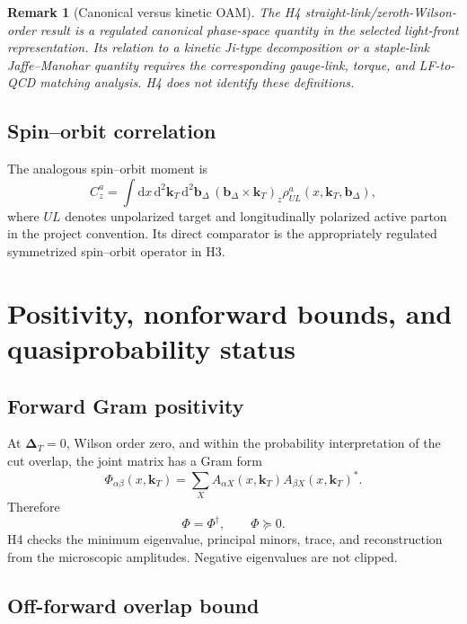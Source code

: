 \documentclass[11pt]{article}
\newtheorem{remark}[definition]{Remark}
\newcommand{\kT}{\bm{k}_{T}}
\newcommand{\DT}{\bm{\Delta}_{T}}
\newcommand{\bD}{\bm{b}_{\Delta}}
\newcommand{\dd}{\mathrm{d}}
\begin{document}
\begin{remark}[Canonical versus kinetic OAM]
The H4 straight-link/zeroth-Wilson-order result is a regulated canonical
phase-space quantity in the selected light-front representation.  Its relation
to a kinetic Ji-type decomposition or a staple-link Jaffe--Manohar quantity
requires the corresponding gauge-link, torque, and LF-to-QCD matching analysis.
H4 does not identify these definitions.
\end{remark}

\subsection{Spin--orbit correlation}

The analogous spin--orbit moment is
\begin{equation}
 C_z^a
 =\int\dd x\,\dd^2\kT\,\dd^2\bD\,
 (\bD\times\kT)_z
 \rho_{UL}^a(x,\kT,\bD),
 \label{eq:spin-orbit-wigner}
\end{equation}
where \(UL\) denotes unpolarized target and longitudinally polarized active
parton in the project convention.  Its direct comparator is the appropriately
regulated symmetrized spin--orbit operator in H3.

\section{Positivity, nonforward bounds, and quasiprobability status}
\label{sec:positivity}

\subsection{Forward Gram positivity}

At \(\DT=0\), Wilson order zero, and within the probability interpretation of
the cut overlap, the joint matrix has a Gram form
\begin{equation}
 \Phi_{\alpha\beta}(x,\kT)
 =\sum_X A_{\alpha X}(x,\kT)
 A_{\beta X}(x,\kT)^*.
 \label{eq:forward-gram}
\end{equation}
Therefore
\begin{equation}
 \Phi=\Phi^\dagger,\qquad \Phi\succeq0.
 \label{eq:forward-psd}
\end{equation}
H4 checks the minimum eigenvalue, principal minors, trace, and reconstruction
from the microscopic amplitudes.  Negative eigenvalues are not clipped.

\subsection{Off-forward overlap bound}
\end{document}
